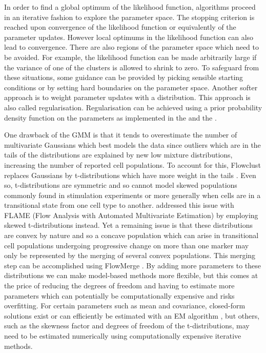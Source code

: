 In order to find a global optimum of the likelihood function, algorithms proceed in an iterative fashion to explore the parameter space.
The stopping criterion is reached upon convergence of the likelihood function or equivalently of the parameter updates.
However local optimums in the likelihood function can also lead to convergence.
There are also regions of the parameter space which need to be avoided.
For example, the likelihood function can be made arbitrarily large if the variance of one of the clusters is allowed to shrink to zero.
To safeguard from these situations,
some guidance can be provided by picking sensible starting conditions or by setting hard boundaries on the parameter space.
Another softer approach is to weight parameter updates with a distribution.
This approach is also called regularisation.
Regularisation can be achieved using a prior probability density function on the parameters as implemented in the 
and the .


One drawback of the \gls{GMM} is that it tends to overestimate the number of multivariate Gaussians which best models the data since outliers
which are in the tails of the distributions
are explained by new low mixture distributions, increasing the number of reported cell populations.
To account for this, Flowclust replaces Gaussians by
t-distributions which have more weight in the tails \citep{Lo:2008it}.
Even so, t-distributions are symmetric and so cannot model skewed populations commonly found in stimulation experiments or more generally when cells are in a transitional state from one cell type to another.
\citet{Pyne:2009hl} addressed this issue with FLAME (Flow Analysis with Automated Multivariate Estimation) by employing skewed t-distributions instead.
Yet a remaining issue is that these distributions are convex by nature and so a concave population which can arise in transitional cell populations undergoing progressive change on more than one marker may only be represented by the merging of several convex populations.
This merging step can be accomplished using FlowMerge \citep{Finak:2009fk}.
By adding more parameters to these distributions we can make model-based methods more flexible,
but this comes at the price of reducing the degrees of freedom and having to estimate more parameters which 
can potentially be computationally expensive and risks overfitting.
For certain parameters such as mean and covariance, closed-form solutions exist or can efficiently be estimated with  an \gls{EM} algorithm \citep{Dempster:1977ul},
but others, such as the skewness factor and degrees of freedom of the t-distributions,
may need to be estimated numerically using computationally expensive iterative methods.

